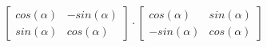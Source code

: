 \documentclass[preview]{standalone}
\begin{document}
\begin{align*}
\begin{bmatrix} cos(\alpha) & -sin(\alpha) \\ sin(\alpha) & cos(\alpha)\end{bmatrix} \cdot  \begin{bmatrix} cos(\alpha) & sin(\alpha) \\ -sin(\alpha) & cos(\alpha)\end{bmatrix}
\end{align*}
\end{document}
